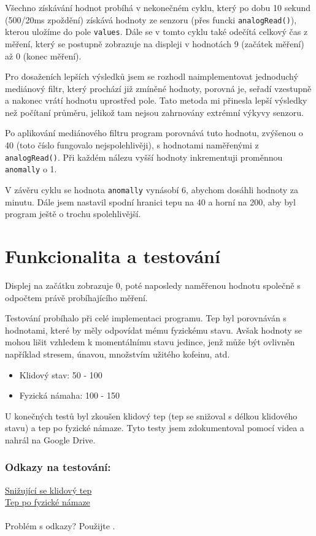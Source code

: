 \documentclass[11.5pt]{article}
\begin{document}
        Všechno získávání hodnot probíhá v nekonečném cyklu, který po dobu 10 sekund (500/20ms zpoždění) získává hodnoty ze senzoru (přes funcki \texttt{analogRead()}), kterou uložíme do pole \texttt{values}. Dále se v tomto cyklu také odečítá celkový čas z měření, který se postupně zobrazuje na displeji v hodnotách 9 (začátek měření) až 0 (konec měření).

        Pro dosaženích lepších výsledků jsem se rozhodl naimplementovat jednoduchý mediánový filtr, který prochází již zmíněné hodnoty, porovná je, seřadí vzestupně a nakonec vrátí hodnotu uprostřed pole. Tato metoda mi přinesla lepší výsledky než počítaní průměru, jelikož tam nejsou zahrnovány extrémní výkyvy senzoru.

        Po aplikování mediánového filtru program porovnává tuto hodnotu, zvýšenou o 40 (toto číslo fungovalo nejspolehlivěji), s hodnotami naměřenými z \texttt{analogRead()}. Při každém nálezu vyšší hodnoty inkrementuji  proměnnou \texttt{anomally} o 1.

        V závěru cyklu se hodnota \texttt{anomally} vynásobí 6, abychom dosáhli hodnoty za minutu. Dále jsem nastavil spodní hranici tepu na 40 a horní na 200, aby byl program ještě o trochu spolehlivější. 
        
        \section{Funkcionalita a testování}
        Displej na začátku zobrazuje 0, poté naposledy naměřenou hodnotu společně s odpočtem právě probíhajícího měření.
        
        Testování probíhalo při celé implementaci programu. Tep byl porovnáván s hodnotami, které by měly odpovídat mému fyzickému stavu. Avšak hodnoty se mohou lišit vzhledem k momentálnímu stavu jedince, jenž může být ovlivněn například stresem, únavou, množstvím užitého kofeinu, atd.
        \begin{itemize}
            \item{Klidový stav: 50 - 100}
            \item{Fyzická námaha: 100 - 150}
        \end{itemize}
        U konečných testů byl zkoušen klidový tep (tep se snižoval s délkou klidového stavu) a tep po fyzické námaze. Tyto testy jsem zdokumentoval pomocí videa a nahrál na Google Drive.
        \subsubsection*{Odkazy na testování:}
        \href{https://drive.google.com/file/d/1SJeyl9q0O1pvIM8aHSfGlxWqP7FoRAWI/view?usp=drive_link}{Snižující se klidový tep}\\
        \href{https://drive.google.com/file/d/1o8epXSymkZcHvcDapgJTr4hES4HnGgzo/view?usp=drive_link}{Tep po fyzické námaze}\\
        \\
        Problém s odkazy? Použijte .
\end{document}
